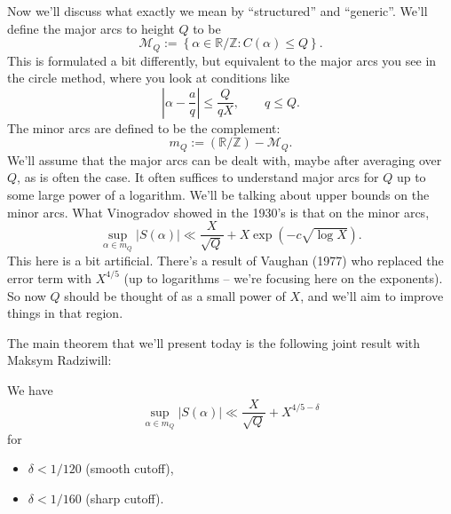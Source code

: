 \documentclass[reqno]{amsart} 
\begin{document}
Now we'll discuss what exactly we mean by ``structured'' and ``generic''.  We'll define the major arcs to height $Q$ to be
\begin{equation*}
  \mathcal{M}_Q := \left\{ \alpha \in \mathbb{R} / \mathbb{Z} : C(\alpha) \leq Q \right\}.
\end{equation*}
This is formulated a bit differently, but equivalent to the major arcs you see in the circle method, where you look at conditions like
\begin{equation*}
  \left| \alpha - \frac{a}{q} \right|
  \leq \frac{Q}{q X}, \qquad q \leq Q.
\end{equation*}
The minor arcs are defined to be the complement:
\begin{equation*}
  m_Q :=(\mathbb{R} / \mathbb{Z}) - \mathcal{M}_Q.
\end{equation*}
We'll assume that the major arcs can be dealt with, maybe after averaging over $Q$, as is often the case.  It often suffices to understand major arcs for $Q$ up to some large power of a logarithm.  We'll be talking about upper bounds on the minor arcs.  What Vinogradov showed in the 1930's is that on the minor arcs, 
\begin{equation*}
  \sup_{\alpha \in m_Q} \lvert S(\alpha) \rvert \ll \frac{X}{\sqrt{Q}}
  + X \exp \left( - c \sqrt{\log X} \right).
\end{equation*}
This here is a bit artificial.  There's a result of Vaughan (1977) who replaced the error term with $X^{4/5}$ (up to logarithms -- we're focusing here on the exponents).  So now $Q$ should be thought of as a small power of $X$, and we'll aim to improve things in that region.

The main theorem that we'll present today is the following joint result with Maksym Radziwill:
\begin{theorem}[P., Radziwill, 2024]
  We have
  \begin{equation*}
    \sup_{\alpha \in m_Q}
    \left| S(\alpha) \right|
    \ll \frac{X}{ \sqrt{Q}}
    + X^{4/5 - \delta}
  \end{equation*}
  for
  \begin{itemize}
  \item $\delta < 1/120$ (smooth cutoff),
  \item $\delta < 1/160$ (sharp cutoff).
  \end{itemize}
\end{theorem}
\end{document}
